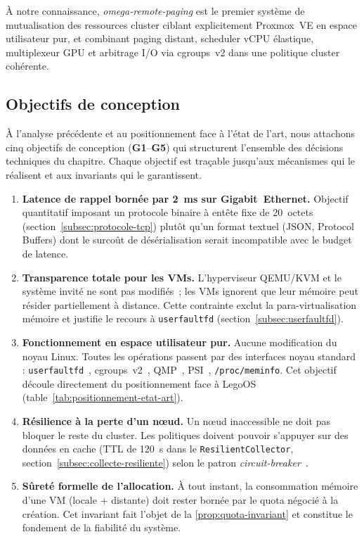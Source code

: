 À notre connaissance, \textit{omega-remote-paging} est le premier système de mutualisation des ressources cluster ciblant explicitement Proxmox~VE en espace utilisateur pur, et combinant paging distant, scheduler vCPU élastique, multiplexeur GPU et arbitrage I/O via cgroups~v2 dans une politique cluster cohérente.

\subsection{Objectifs de conception}
\label{subsec:contraintes-nf}

À l'analyse précédente et au positionnement face à l'état de l'art, nous attachons cinq objectifs de conception (\textbf{G1}--\textbf{G5}) qui structurent l'ensemble des décisions techniques du chapitre. Chaque objectif est traçable jusqu'aux mécanismes qui le réalisent et aux invariants qui le garantissent.

\begin{enumerate}[label=\textbf{G\arabic*.}, leftmargin=*]
    \item \textbf{Latence de rappel bornée par 2~ms sur Gigabit~Ethernet.} Objectif quantitatif imposant un protocole binaire à entête fixe de 20~octets (section~\ref{subsec:protocole-tcp}) plutôt qu'un format textuel (JSON, Protocol Buffers) dont le surcoût de désérialisation serait incompatible avec le budget de latence.
    \item \textbf{Transparence totale pour les VMs.} L'hyperviseur QEMU/KVM et le système invité ne sont pas modifiés~; les VMs ignorent que leur mémoire peut résider partiellement à distance. Cette contrainte exclut la para-virtualisation mémoire et justifie le recours à \texttt{userfaultfd} (section~\ref{subsec:userfaultfd}).
    \item \textbf{Fonctionnement en espace utilisateur pur.} Aucune modification du noyau Linux. Toutes les opérations passent par des interfaces noyau standard : \texttt{userfaultfd}~\cite{userfaultfd_man}, cgroups~v2~\cite{cgroups_v2_doc}, QMP~\cite{qemu_doc}, PSI~\cite{psi_doc}, \texttt{/proc/meminfo}. Cet objectif découle directement du positionnement face à LegoOS (table~\ref{tab:positionnement-etat-art}).
    \item \textbf{Résilience à la perte d'un nœud.} Un nœud inaccessible ne doit pas bloquer le reste du cluster. Les politiques doivent pouvoir s'appuyer sur des données en cache (TTL de 120~s dans le \texttt{ResilientCollector}, section~\ref{subsec:collecte-resiliente}) selon le patron \emph{circuit-breaker}~\cite{nygard_release}.
    \item \textbf{Sûreté formelle de l'allocation.} À tout instant, la consommation mémoire d'une VM (locale + distante) doit rester bornée par le quota négocié à la création. Cet invariant fait l'objet de la \autoref{prop:quota-invariant} et constitue le fondement de la fiabilité du système.
\end{enumerate}

